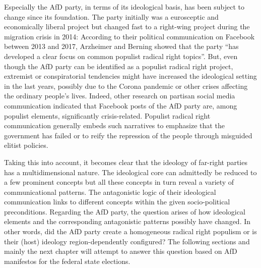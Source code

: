 \documentclass[a4paper]{scrreprt}
\begin{document}
Especially the AfD party, in terms of its ideological basis, has been subject to change since its foundation. The party initially was a eurosceptic and economically liberal project but changed fast to a right-wing project during the migration crisis in 2014: According to their political communication on Facebook between 2013 and 2017, Arzheimer and Berning showed that the party ``has developed a clear focus on common populist radical right topics''. \cite[p.~3]{arzheimer:2019} But, even though the AfD party can be identified as a populist radical right project, extremist or conspiratorial tendencies might have increased the ideological setting in the last years, possibly due to the Corona pandemic or other crises affecting the ordinary people's lives. Indeed, other research on partisan social media communication indicated that Facebook posts of the AfD party are, among populist elements, significantly crisis-related. \citep{gruendl:2022} Populist radical right communication generally embeds such narratives to emphasize that the government has failed or to reify the repression of the people through misguided elitist policies.\par
Taking this into account, it becomes clear that the ideology of far-right parties has a multidimensional nature. The ideological core can admittedly be reduced to a few prominent concepts but all these concepts in turn reveal a variety of communicational patterns. The antagonistic logic of their ideological communication links to different concepts within the given socio-political preconditions. Regarding the AfD party, the question arises of how ideological elements and the corresponding antagonistic patterns possibly have changed. In other words, did the AfD party create a homogeneous radical right populism or is their (host) ideology region-dependently configured? The following sections and mainly the next chapter will attempt to answer this question based on AfD manifestos for the federal state elections.
\end{document}
